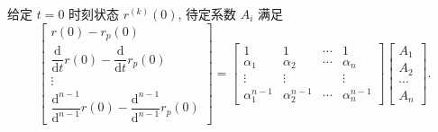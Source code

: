 给定 $t=0$ 时刻状态 $r^{(k)}(0)$, 待定系数 $A_i$ 满足
\begin{equation} \label{eq:2.1 final equation}
    \begin{bmatrix}
        r(0)-r_p(0)                                                               \\
        \dfrac{\mathrm{d}}{\mathrm{d}t}r(0)-\dfrac{\mathrm{d}}{\mathrm{d}t}r_p(0) \\
        \vdots                                                                    \\
        \dfrac{\mathrm{d}^{n-1}}{\mathrm{d}^{n-1}}r(0)-\dfrac{\mathrm{d}^{n-1}}{\mathrm{d}^{n-1}}r_p(0)
    \end{bmatrix}=
    \begin{bmatrix}
        1              & 1              & \cdots & 1              \\
        \alpha_1       & \alpha_2       & \cdots & \alpha_n       \\
        \vdots         & \vdots         &        & \vdots         \\
        \alpha_1^{n-1} & \alpha_2^{n-1} & \cdots & \alpha_n^{n-1}
    \end{bmatrix}
    \begin{bmatrix}
        A_1    \\
        A_2    \\
        \cdots \\
        A_n
    \end{bmatrix}.
\end{equation}


